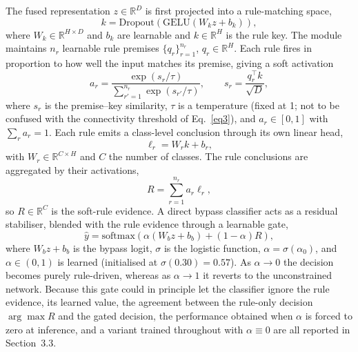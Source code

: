 \documentclass[pdflatex,sn-basic,Numbered]{sn-jnl}
\begin{document}
The fused representation $z \in \mathbb{R}^D$ is first projected into a rule-matching space,
\begin{equation}
k = \mathrm{Dropout}\!\left(\mathrm{GELU}(W_k z + b_k)\right), \label{eq14}
\end{equation}
where $W_k \in \mathbb{R}^{H\times D}$ and $b_k$ are learnable and $k \in \mathbb{R}^H$ is the rule key. The module maintains $n_r$ learnable rule premises $\{q_r\}_{r=1}^{n_r}$, $q_r \in \mathbb{R}^H$. Each rule fires in proportion to how well the input matches its premise, giving a soft activation
\begin{equation}
a_r = \frac{\exp(s_r/\tau)}{\sum_{r'=1}^{n_r}\exp(s_{r'}/\tau)}, \qquad s_r = \frac{q_r^\top k}{\sqrt{D}}, \label{eq15}
\end{equation}
where $s_r$ is the premise--key similarity, $\tau$ is a temperature (fixed at 1; not to be confused with the connectivity threshold of Eq.~\eqref{eq3}), and $a_r \in [0,1]$ with $\sum_r a_r = 1$. Each rule emits a class-level conclusion through its own linear head,
\begin{equation}
\ell_r = W_r k + b_r, \label{eq16}
\end{equation}
with $W_r \in \mathbb{R}^{C\times H}$ and $C$ the number of classes. The rule conclusions are aggregated by their activations,
\begin{equation}
R = \sum_{r=1}^{n_r} a_r \ell_r, \label{eq17}
\end{equation}
so $R \in \mathbb{R}^C$ is the soft-rule evidence. A direct bypass classifier acts as a residual stabiliser, blended with the rule evidence through a learnable gate,
\begin{equation}
\hat y = \mathrm{softmax}\!\left(\alpha(W_b z + b_b) + (1-\alpha) R\right), \label{eq18}
\end{equation}
where $W_b z + b_b$ is the bypass logit, $\sigma$ is the logistic function, $\alpha = \sigma(\alpha_0)$, and $\alpha \in (0,1)$ is learned (initialised at $\sigma(0.30)=0.57$). As $\alpha \to 0$ the decision becomes purely rule-driven, whereas as $\alpha \to 1$ it reverts to the unconstrained network. Because this gate could in principle let the classifier ignore the rule evidence, its learned value, the agreement between the rule-only decision $\arg\max R$ and the gated decision, the performance obtained when $\alpha$ is forced to zero at inference, and a variant trained throughout with $\alpha\equiv0$ are all reported in Section~3.3.
\end{document}
